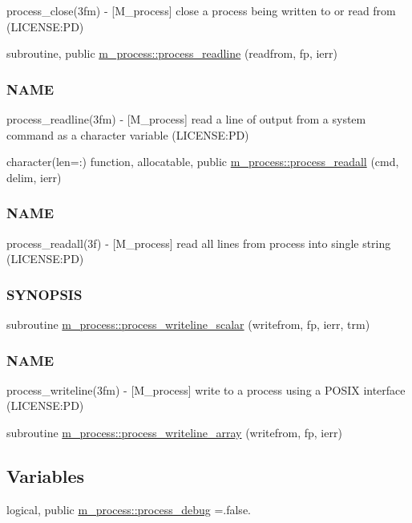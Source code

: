 \begin{DoxyCompactItemize}
\begin{DoxyCompactList}
process\+\_\+close(3fm) -\/ \mbox{[}M\+\_\+process\mbox{]} close a process being written to or read from (L\+I\+C\+E\+N\+SE\+:PD) \end{DoxyCompactList}\item 
subroutine, public \mbox{\hyperlink{namespacem__process_acbc72c5ed371430a471aa1f3010fbbda}{m\+\_\+process\+::process\+\_\+readline}} (readfrom, fp, ierr)
\begin{DoxyCompactList}\small\item\em \subsubsection*{N\+A\+ME}

process\+\_\+readline(3fm) -\/ \mbox{[}M\+\_\+process\mbox{]} read a line of output from a system command as a character variable (L\+I\+C\+E\+N\+SE\+:PD) \end{DoxyCompactList}\item 
character(len=\+:) function, allocatable, public \mbox{\hyperlink{namespacem__process_a7dd759a1344789477ae1e205d7fa9a51}{m\+\_\+process\+::process\+\_\+readall}} (cmd, delim, ierr)
\begin{DoxyCompactList}\small\item\em \subsubsection*{N\+A\+ME}

process\+\_\+readall(3f) -\/ \mbox{[}M\+\_\+process\mbox{]} read all lines from process into single string (L\+I\+C\+E\+N\+SE\+:PD) \subsubsection*{S\+Y\+N\+O\+P\+S\+IS}\end{DoxyCompactList}\item 
subroutine \mbox{\hyperlink{namespacem__process_a72527c0ec0af26dcb14b8bfad6dcd482}{m\+\_\+process\+::process\+\_\+writeline\+\_\+scalar}} (writefrom, fp, ierr, trm)
\begin{DoxyCompactList}\small\item\em \subsubsection*{N\+A\+ME}

process\+\_\+writeline(3fm) -\/ \mbox{[}M\+\_\+process\mbox{]} write to a process using a P\+O\+S\+IX interface (L\+I\+C\+E\+N\+SE\+:PD) \end{DoxyCompactList}\item 
subroutine \mbox{\hyperlink{namespacem__process_a08887a918eba167ceacddf58ca084270}{m\+\_\+process\+::process\+\_\+writeline\+\_\+array}} (writefrom, fp, ierr)
\end{DoxyCompactItemize}
\subsection*{Variables}
\begin{DoxyCompactItemize}
\item 
logical, public \mbox{\hyperlink{namespacem__process_a0fabee8d01338d5523fbdea5c5f1e894}{m\+\_\+process\+::process\+\_\+debug}} =.false.
\end{DoxyCompactItemize}
